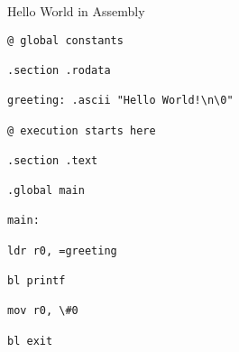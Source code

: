 


\begin{frame}{Hello World in Assembly}
\begin{verbatim}
@ global constants

.section .rodata

greeting: .ascii "Hello World!\n\0"

@ execution starts here

.section .text

.global main

main:

ldr r0, =greeting

bl printf

mov r0, \#0

bl exit
\end{verbatim}
\end{frame}



